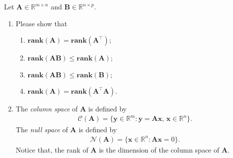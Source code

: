 \documentclass[11pt,letter,notitlepage]{article}
\newcommand{\rank}[1]{ \textbf{rank}  (#1)  }
\begin{document}
\begin{exercise}
	Let $\mathbf{A} \in \mathbb{R}^{m\times n}$ and $\mathbf{B}\in \mathbb{R}^{n\times p}$.
	\begin{enumerate}
	    \item Please show that
            \begin{enumerate}
                \item $\rank{\mathbf{A}} = \rank{\mathbf{A}^{\top}}$;
                \item $\rank{\mathbf{A}\mathbf{B}} \leq \rank{\mathbf{A}}$;
                \item $\rank{\mathbf{A}\mathbf{B}} \leq \rank{\mathbf{B}}$;
                \item $\rank{\mathbf{A}} = \rank{\mathbf{A}^{\top}  \mathbf{A}}$.
            \end{enumerate}
        \item The \emph{column space} of $\mathbf{A}$ is defined by
                \begin{align*}
                    \mathcal{C}(\mathbf{A} ) = \{ \mathbf{y}\in \mathbb{R}^m : \mathbf{y} = \mathbf{Ax},\,\mathbf{x}\in\mathbb{R}^n\}.
                \end{align*}
                The \emph{null space} of $\mathbf{A}$ is defined by
                \begin{align*}
                    \mathcal{N}(\mathbf{A})  = \{ \mathbf{x}\in \mathbb{R}^n : \mathbf{Ax}=0\}.
                \end{align*}
                Notice that, the rank of $\mathbf{A}$ is the dimension of the column space of $\mathbf{A}$.
                

\end{enumerate}
\end{exercise}
\end{document}

